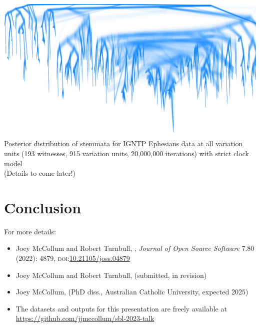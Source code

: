 \documentclass[10pt]{beamer}
\begin{document}
	\begin{frame}
		\begin{center}
			\includegraphics[width=\textwidth]{../img/igntp_ephesians_strict_densitree_unlabeled.pdf}\\
			Posterior distribution of stemmata for IGNTP Ephesians data at all variation units (193 witnesses, 915 variation units, 20,000,000 iterations) with strict clock model\\
			(Details to come later!)
		\end{center}
	\end{frame}
	\section{Conclusion}
	\begin{frame}
		For more details:
		\begin{itemize}
			\item Joey McCollum and Robert Turnbull, , \emph{Journal of Open Source Software} 7.80 (2022): 4879, \textsc{doi}:\href{https://doi.org/10.21105/joss.04879}{10.21105/joss.04879}
			\item Joey McCollum and Robert Turnbull,  (submitted, in revision)
			\item Joey McCollum,  (PhD diss., Australian Catholic University, expected 2025)
			\item The datasets and outputs for this presentation are freely available at \url{https://github.com/jjmccollum/sbl-2023-talk}
		\end{itemize}
	\end{frame}
\end{document}
